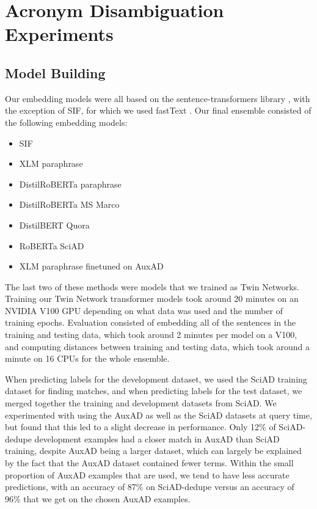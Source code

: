 \documentclass[letterpaper]{article} %
\begin{document}
\section{Acronym Disambiguation Experiments}
\subsection{Model Building}
Our embedding models were all based on the sentence-transformers library \cite{reimers-2019-sentence-bert}, with the exception of SIF, for which we used fastText \cite{joulin2016fasttext}. Our final ensemble consisted of the following embedding models:

\begin{itemize}
    \item SIF
    \item XLM paraphrase
    \item DistilRoBERTa paraphrase
    \item DistilRoBERTa MS Marco
    \item DistilBERT Quora
    \item RoBERTa SciAD
    \item XLM paraphrase finetuned on AuxAD
\end{itemize}

The last two of these methods were models that we trained as Twin Networks. Training our Twin Network transformer models took around 20 minutes on an NVIDIA V100 GPU depending on what data was used and the number of training epochs. Evaluation consisted of embedding all of the sentences in the training and testing data, which took around 2 minutes per model on a V100, and computing distances between training and testing data, which took around a minute on 16 CPUs for the whole ensemble.

When predicting labels for the development dataset, we used the SciAD training dataset for finding matches, and when predicting labels for the test dataset, we merged together the training and development datasets from SciAD. We experimented with using the AuxAD as well as the SciAD datasets at query time, but found that this led to a slight decrease in performance. Only 12\% of SciAD-dedupe development examples had a closer match in AuxAD than SciAD training, despite AuxAD being a larger dataset, which can largely be explained by the fact that the AuxAD dataset contained fewer terms. Within the small proportion of AuxAD examples that are used, we tend to have less accurate predictions, with an accuracy of 87\% on SciAD-dedupe versus an accuracy of 96\% that we get on the chosen AuxAD examples.
\end{document}
